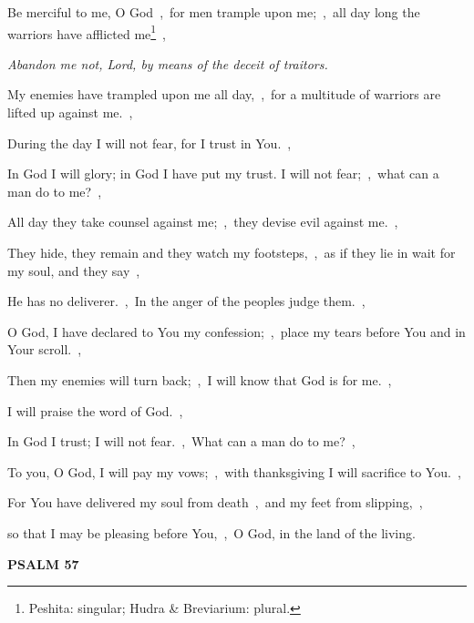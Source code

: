 \documentclass[12pt,twoside,a5paper]{article}
\newcommand{\psalm}[1]{\textbf{PSALM {#1}}\nopagebreak}
\newcommand{\qanona}[1]{{\liturgicalhint{Qanona.} \emph{#1}}}
\begin{document}
\begin{normalparskip}
  Be merciful to me, O God~\sep\ for men trample upon me;~\sep\ all day long the warriors have afflicted me\footnote{Peshita: singular; Hudra \& Breviarium: plural.}~\sep

  \qanona{Abandon me not, Lord, by means of the deceit of traitors.}

  My enemies have trampled upon me all day,~\sep\ for a multitude of warriors are lifted up against me.~\sep

  During the day I will not fear, for I trust in You.~\sep

  In God I will glory; in God I have put my trust. I will not fear;~\sep\ what can a man do to me?~\sep

  All day they take counsel against me;~\sep\ they devise evil against me.~\sep

  They hide, they remain and they watch my footsteps,~\sep\ as if they lie in wait for my soul, and they say~\sep

  He has no deliverer.~\sep\ In the anger of the peoples judge them.~\sep

  O God, I have declared to You my confession;~\sep\ place my tears before You and in Your scroll.~\sep

  Then my enemies will turn back;~\sep\ I will know that God is for me.~\sep

  I will praise the word of God.~\sep

  In God I trust; I will not fear.~\sep\ What can a man do to me?~\sep

  To you, O God, I will pay my vows;~\sep\ with thanksgiving I will sacrifice to You.~\sep

  For You have delivered my soul from death~\sep\ and my feet from slipping,~\sep

  so that I may be pleasing before You,~\sep\ O God, in the land of the living.
\end{normalparskip}

\psalm{57}
\end{document}
